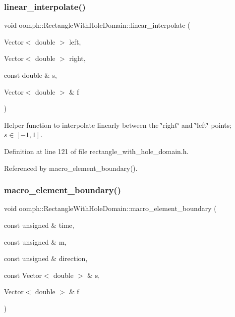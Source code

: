 \subsubsection{\texorpdfstring{linear\+\_\+interpolate()}{linear\_interpolate()}}
{\footnotesize\ttfamily void oomph\+::\+Rectangle\+With\+Hole\+Domain\+::linear\+\_\+interpolate (\begin{DoxyParamCaption}\item[{Vector$<$ double $>$}]{left,  }\item[{Vector$<$ double $>$}]{right,  }\item[{const double \&}]{s,  }\item[{Vector$<$ double $>$ \&}]{f }\end{DoxyParamCaption})\hspace{0.3cm}{\ttfamily [inline]}}



Helper function to interpolate linearly between the \char`\"{}right\char`\"{} and \char`\"{}left\char`\"{} points; $ s \in [-1,1] $. 



Definition at line 121 of file rectangle\+\_\+with\+\_\+hole\+\_\+domain.\+h.



Referenced by macro\+\_\+element\+\_\+boundary().

\mbox{\label{classoomph_1_1RectangleWithHoleDomain_a514085f80059aa9f0cc3334a3cb408c1}} 
\subsubsection{\texorpdfstring{macro\+\_\+element\+\_\+boundary()}{macro\_element\_boundary()}}
{\footnotesize\ttfamily void oomph\+::\+Rectangle\+With\+Hole\+Domain\+::macro\+\_\+element\+\_\+boundary (\begin{DoxyParamCaption}\item[{const unsigned \&}]{time,  }\item[{const unsigned \&}]{m,  }\item[{const unsigned \&}]{direction,  }\item[{const Vector$<$ double $>$ \&}]{s,  }\item[{Vector$<$ double $>$ \&}]{f }\end{DoxyParamCaption})\hspace{0.3cm}{\ttfamily [inline]}}




